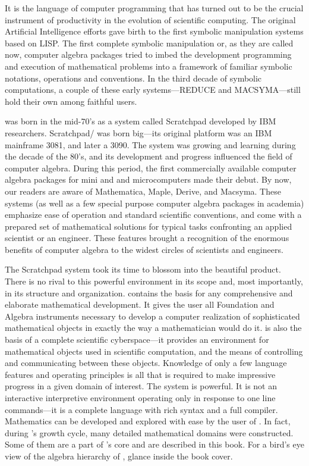 It is the language of computer programming that has turned out to
be the crucial instrument of productivity in the evolution of
scientific computing.
The original Artificial Intelligence efforts gave birth to the
first symbolic manipulation systems based on LISP.
The first complete symbolic manipulation or, as they are called
now, computer algebra packages tried to imbed the development
programming and execution of mathematical problems into a
framework of familiar symbolic notations, operations and
conventions.
In the third decade of symbolic computations, a couple of these
early systems---REDUCE and MACSYMA---still hold their own among
faithful users.

\Language{} was born in the mid-70's as a system called Scratchpad
developed by IBM researchers.
Scratchpad/\Language{} was born big---its original platform was an
IBM mainframe 3081, and later a 3090.
The system was growing and learning during the decade of the 80's,
and its development and progress influenced the field of computer
algebra.
During this period, the first commercially available computer
algebra packages for mini and and microcomputers made their debut.
By now, our readers are aware of Mathematica, Maple, Derive, and
Macsyma.
These systems (as well as a few special purpose computer algebra
packages in academia) emphasize ease of operation and standard
scientific conventions, and come with a prepared set of
mathematical solutions for typical tasks confronting an applied
scientist or an engineer.
These features brought a recognition of the enormous benefits of
computer algebra to the widest circles of scientists and
engineers.

The Scratchpad system took its time to blossom into the beautiful
\Language{} product.
There is no rival to this powerful environment in its scope and,
most importantly, in its structure and organization.
\Language{} contains the basis for any comprehensive and elaborate
mathematical development.
It gives the user all Foundation and Algebra instruments necessary
to develop a computer realization of sophisticated mathematical
objects in exactly the way a mathematician would do it.
\Language{} is also the basis of a complete scientific
cyberspace---it provides an environment for mathematical objects
used in scientific computation, and the means of controlling and
communicating between these objects.
Knowledge of only a few \Language{} language features and
operating principles is all that is required to make impressive
progress in a given domain of interest.
The system is powerful.
It is not an interactive interpretive environment operating only
in response to one line commands---it is a complete language with
rich syntax and a full compiler.
Mathematics can be developed and explored with ease by the user of
\Language{}.
In fact, during \Language{}'s growth cycle, many detailed
mathematical domains were constructed.
Some of them are a part of \Language{}'s core and are described in
this book.
For a bird's eye view of the algebra hierarchy of \Language{},
glance inside the book cover.

